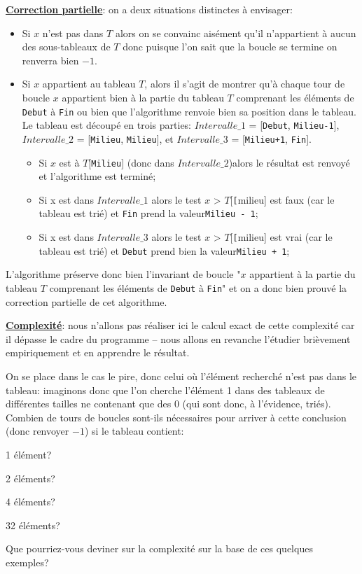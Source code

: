 \documentclass[12pt]{article}
\begin{document}
	\textbf{\uline{Correction partielle}}: on a deux situations distinctes à envisager:
	\begin{itemize}
		\item Si $x$ n'est pas dans $T$ alors on se convainc aisément qu'il n'appartient à aucun des sous-tableaux de $T$ donc puisque l'on sait que la boucle se termine on renverra bien $-1$.
		\item Si $x$ appartient au tableau $T$, alors il s'agit de montrer qu'à chaque tour de boucle $x$ appartient bien à la partie du tableau $T$ comprenant les éléments de \texttt{Debut} à \texttt{Fin} ou bien que l'algorithme renvoie bien sa position dans le tableau. Le tableau est découpé en trois parties: $Intervalle\_1$ = [\texttt{Debut}, \texttt{Milieu-1}], $Intervalle\_2$ =  [\texttt{Milieu}, \texttt{Milieu}], et $Intervalle\_3$ = [\texttt{Milieu+1}, \texttt{Fin}].
		\begin{itemize}
			\item Si $x$ est à $T$[\texttt{Milieu}] (donc dans $Intervalle\_2$)alors le résultat est renvoyé et l'algorithme est terminé;
			\item Si x est dans $Intervalle\_1$ alors le test $x$ > $T$[\texttt[{milieu}] est faux (car le tableau est trié) et \texttt{Fin} prend la valeur\texttt{Milieu - 1};
			\item Si x est dans $Intervalle\_3$ alors le test $x$ > $T$[\texttt[{milieu}] est vrai (car le tableau est trié) et \texttt{Debut} prend bien la valeur\texttt{Milieu + 1};
		\end{itemize}
	\end{itemize}
	
	L'algorithme préserve donc bien l'invariant de boucle "$x$ appartient à la partie du tableau $T$ comprenant les éléments de \texttt{Debut} à \texttt{Fin}" et on a donc bien prouvé la correction partielle de cet algorithme.
	
	\textbf{\uline{Complexité}}: nous n'allons pas réaliser ici le calcul exact de cette complexité car il dépasse le cadre du programme -- nous allons en revanche l'étudier brièvement empiriquement et en apprendre le résultat.
	
	\begin{MonExo}
		On se place dans le cas le pire, donc celui où l'élément recherché n'est pas dans le tableau: imaginons donc que l'on cherche l'élément 1 dans des tableaux de différentes tailles ne contenant que des 0 (qui sont donc, à l'évidence, triés). Combien de tours de boucles sont-ils nécessaires pour arriver à cette conclusion (donc renvoyer $-1$) si le tableau contient:
		\begin{alphenum}
			\item 1 élément?
			\item 2 éléments?
			\item 4 éléments?
			\item 32 éléments?
			\item Que pourriez-vous deviner sur la complexité sur la base de ces quelques exemples?
		\end{alphenum}
	\end{MonExo}
	
\end{document}
